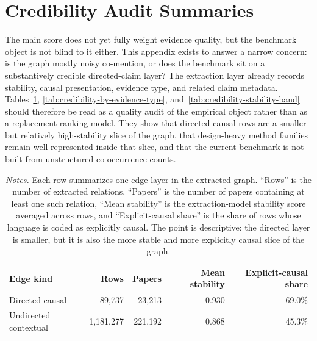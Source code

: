 \documentclass[11pt]{article}
\newcommand{\fignotes}[1]{\caption*{\textit{Notes.} #1}}
\begin{document}


\section{Credibility Audit Summaries}
\label{app:credibility-audit}

The main score does not yet fully weight evidence quality, but the benchmark object is not blind to it either. This appendix exists to answer a narrow concern: is the graph mostly noisy co-mention, or does the benchmark sit on a substantively credible directed-claim layer? The extraction layer already records stability, causal presentation, evidence type, and related claim metadata. Tables~\ref{tab:credibility-edge-kind}, \ref{tab:credibility-by-evidence-type}, and~\ref{tab:credibility-stability-band} should therefore be read as a quality audit of the empirical object rather than as a replacement ranking model. They show that directed causal rows are a smaller but relatively high-stability slice of the graph, that design-heavy method families remain well represented inside that slice, and that the current benchmark is not built from unstructured co-occurrence counts.

\begin{table}[h]
  \caption{Credibility audit by edge kind}
  \label{tab:credibility-edge-kind}
  \centering
  \begin{tabular}{lrrrr}
    \toprule
    Edge kind & Rows & Papers & Mean stability & Explicit-causal share \\
    \midrule
    Directed causal & 89{,}737 & 23{,}213 & 0.930 & 69.0\% \\
    Undirected contextual & 1{,}181{,}277 & 221{,}192 & 0.868 & 45.3\% \\
    \bottomrule
  \end{tabular}
  \fignotes{Each row summarizes one edge layer in the extracted graph. ``Rows'' is the number of extracted relations, ``Papers'' is the number of papers containing at least one such relation, ``Mean stability'' is the extraction-model stability score averaged across rows, and ``Explicit-causal share'' is the share of rows whose language is coded as explicitly causal. The point is descriptive: the directed layer is smaller, but it is also the more stable and more explicitly causal slice of the graph.}
\end{table}
\end{document}

